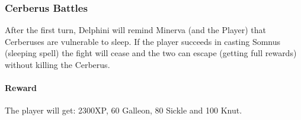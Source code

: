 \subsubsection{Cerberus Battles}

After the first turn, Delphini will remind Minerva (and the Player) that Cerberuses are vulnerable to sleep. If the player succeeds in casting Somnus (sleeping spell) the fight will cease and the two can escape (getting full rewards) without killing the Cerberus.

\paragraph{Reward} The player will get: 2300XP, 60 Galleon, 80 Sickle and 100 Knut.